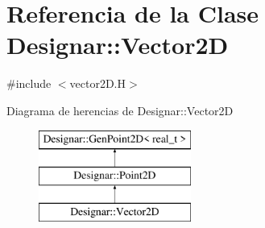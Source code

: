 \hypertarget{class_designar_1_1_vector2_d}{}\section{Referencia de la Clase Designar\+:\+:Vector2D}
\label{class_designar_1_1_vector2_d}


{\ttfamily \#include $<$vector2\+D.\+H$>$}

Diagrama de herencias de Designar\+:\+:Vector2D\begin{figure}[H]
\begin{center}
\leavevmode
\includegraphics[height=3.000000cm]{class_designar_1_1_vector2_d}
\end{center}
\end{figure}
